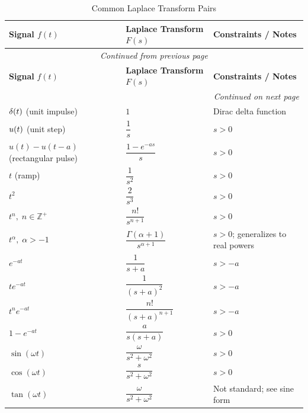 \begin{longtable}{lll}
    \caption{Common Laplace Transform Pairs}
    \label{tab:laplace_pairs} \\

    \toprule
    \textbf{Signal } $f(t)$ & \textbf{Laplace Transform } $F(s)$ & \textbf{Constraints / Notes} \\
    \midrule
    \endfirsthead

    \multicolumn{3}{c}{\textit{Continued from previous page}} \\
    \midrule
    \textbf{Signal } $f(t)$ & \textbf{Laplace Transform } $F(s)$ & \textbf{Constraints / Notes} \\
    \midrule
    \endhead

    \midrule
    \multicolumn{3}{r}{\textit{Continued on next page}} \\
    \endfoot

    \bottomrule
    \endlastfoot

    $\delta(t)$ (unit impulse) & $1$ & Dirac delta function \\
    $u(t)$ (unit step) & $\dfrac{1}{s}$ & $s > 0$ \\
    $u(t) - u(t-a)$ (rectangular pulse) & $\dfrac{1-e^{-as}}{s}$ & $s > 0$ \\

    $t$ (ramp) & $\dfrac{1}{s^2}$ & $s > 0$ \\
    $t^2$ & $\dfrac{2}{s^3}$ & $s > 0$ \\
    $t^n, \; n \in \mathbb{Z}^+$ & $\dfrac{n!}{s^{n+1}}$ & $s > 0$ \\
    $t^\alpha, \; \alpha > -1$ & $\dfrac{\Gamma(\alpha+1)}{s^{\alpha+1}}$ & $s > 0$; generalizes to real powers \\

    $e^{-at}$ & $\dfrac{1}{s+a}$ & $s > -a$ \\
    $te^{-at}$ & $\dfrac{1}{(s+a)^2}$ & $s > -a$ \\
    $t^n e^{-at}$ & $\dfrac{n!}{(s+a)^{n+1}}$ & $s > -a$ \\
    $1 - e^{-at}$ & $\dfrac{a}{s(s+a)}$ & $s > 0$ \\

    $\sin(\omega t)$ & $\dfrac{\omega}{s^2 + \omega^2}$ & $s > 0$ \\
    $\cos(\omega t)$ & $\dfrac{s}{s^2 + \omega^2}$ & $s > 0$ \\
    $\tan(\omega t)$ & $\dfrac{\omega}{s^2 + \omega^2}$ & Not standard; see sine form \\


\end{longtable}
